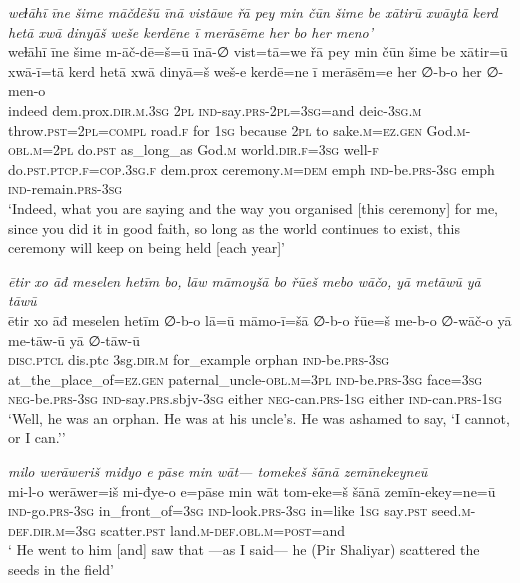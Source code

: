 \ea \label{ZP.128}
\textit{weɫāhī īne šime māčdēšū īnā vistāwe řā pey min čūn šime be xātirū xwāytā kerd hetā xwā dinyāš weše kerdēne ī merāsēme her bo her meno’} \\ 
\gll weɫāhī īne šime m-āč-dē=š=ū īnā-∅ vist=tā=we řā pey min čūn šime be xātir=ū xwā-ī=tā kerd hetā xwā dinyā=š weš-e kerdē=ne ī merāsēm=e her ∅-b-o her ∅-men-o \\ 
 indeed dem.prox\textsc{.dir}\textsc{.m}\textsc{.3sg} \textsc{2pl} \textsc{ind-}say\textsc{.prs}-\textsc{2pl}\textsc{=3sg}=and deic\textsc{-3sg}\textsc{.m} throw\textsc{.pst}=\textsc{2pl}\textsc{=compl} road\textsc{.f} for \textsc{1sg} because \textsc{2pl} to sake\textsc{.m}\textsc{\textsc{=ez.gen}} God\textsc{.m}\textsc{-obl}\textsc{.m}=\textsc{2pl} do\textsc{.pst} as\_long\_as God\textsc{.m} world\textsc{.dir}\textsc{.f}\textsc{=3sg} well\textsc{-f} do\textsc{.pst}\textsc{.ptcp}\textsc{.f}\textsc{=cop}\textsc{.3sg}\textsc{.f} dem.prox ceremony\textsc{.m}\textsc{=dem} emph \textsc{ind-}be\textsc{.prs}\textsc{-3sg} emph \textsc{ind-}remain\textsc{.prs}\textsc{-3sg} \\ 
\glt `Indeed, what you are saying and the way you organised [this ceremony] for me, since you did it in good faith, so long as the world continues to exist, this ceremony will keep on being held [each year]'
\z 
 
\ea \label{ŽP.28}
\textit{ētir xo āđ meselen hetīm bo, lāw māmoyšā bo řūeš mebo wāčo, yā metāwū yā tāwū} \\ 
\gll ētir xo āđ meselen hetīm ∅-b-o lā=ū māmo-ī=šā ∅-b-o řūe=š me-b-o ∅-wāč-o yā me-tāw-ū yā ∅-tāw-ū \\ 
 \textsc{disc.ptcl} dis.ptc 3sg\textsc{.dir}\textsc{.m} for\_example orphan \textsc{ind-}be\textsc{.prs}\textsc{-3sg} at\_the\_place\_of\textsc{\textsc{=ez.gen}} paternal\_uncle\textsc{-obl}\textsc{.m}\textsc{=3pl} \textsc{ind-}be\textsc{.prs}\textsc{-3sg} face\textsc{=3sg} \textsc{neg-}be\textsc{.prs}\textsc{-3sg} \textsc{ind-}say\textsc{.prs}.sbjv\textsc{-3sg} either \textsc{neg-}can\textsc{.prs}\textsc{-\textsc{1sg}} either \textsc{ind-}can\textsc{.prs}\textsc{-\textsc{1sg}} \\ 
\glt `Well, he was an orphan. He was at his uncle’s. He was ashamed to say, ‘I cannot, or I can.’'
\z 
 
\ea \label{ŽP.51}
\textit{milo werāweriš miđyo e pāse min wāt— tomekeš šānā zemīnekeyneū} \\ 
\gll mi-l-o werāwer=iš mi-đye-o e=pāse min wāt tom-eke=š šānā zemīn-ekey=ne=ū \\ 
 \textsc{ind-}go\textsc{.prs}\textsc{-3sg} in\_front\_of\textsc{=3sg} \textsc{ind-}look\textsc{.prs}\textsc{-3sg} in=like \textsc{1sg} say\textsc{.pst} seed\textsc{.m}\textsc{-def}\textsc{.dir}\textsc{.m}\textsc{=3sg} scatter\textsc{.pst} land\textsc{.m}\textsc{-def}\textsc{.obl}\textsc{.m}\textsc{=\textsc{post}}=and \\ 
\glt ` He went to him [and] saw that —as I said— he (Pir Shaliyar) scattered the seeds in the field'
\z 
 
